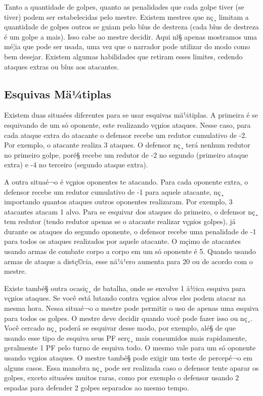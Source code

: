 Tanto a quantidade de golpes, quanto as penalidades que cada golpe tiver (se tiver) podem ser estabelecidas pelo mestre. Existem mestres que nç¸ limitam a quantidade de golpes outros se guiam pelo bîus de destreza (cada bîus de destreza é um golpe a mais). Isso cabe ao mestre decidir. Aqui nî§ apenas mostramos uma mé¦ia que pode ser usada, uma vez que o narrador pode utilizar do modo como bem desejar. Existem algumas habilidades que retiram esses limites, cedendo ataques extras ou bîus aos atacantes. 

\subsection{Esquivas Mä¼tiplas}

Existem duas situaées diferentes para se usar esquivas mä¼tiplas. A primeira é se esquivando de um só oponente, este realizando vçµios ataques. Nesse caso, para cada ataque extra do atacante o defensor recebe um redutor cumulativo de -2. Por exemplo, o atacante realiza 3 ataques. O defensor nç¸ terá nenhum redutor no primeiro golpe, poré§ recebe um redutor de -2 no segundo (primeiro ataque extra) e -4 no terceiro (segundo ataque extra).

A outra situaé¬o é vçµios oponentes te atacando.  Para cada oponente extra, o defensor recebe um redutor cumulativo de -1 para aquele atacante, nç¸ importando quantos ataques outros oponentes realizaram. Por exemplo, 3 atacantes atacam 1 alvo. Para se esquivar dos ataques do primeiro, o defensor nç¸ tem redutor (tendo redutor apenas se o atacante realizar vçµios golpes), já durante os ataques do segundo oponente, o defensor recebe uma penalidade de -1 para todos os ataques realizados por aquele atacante. O mçimo de atacantes usando armas de combate corpo a corpo em um só oponente é 5. Quando usando armas de ataque a distç©cia, esse nä¼¹ero aumenta para 20 ou de acordo com o mestre.

Existe també§ outra ocasiç¸ de batalha, onde se envolve 1 ä½ica esquiva para vçµios ataques. Se você está lutando contra vçµios alvos eles podem atacar na mesma hora. Nessa situaé¬o o mestre pode permitir o uso de apenas uma esquiva para todos os golpes. O mestre deve decidir quando você pode fazer isso ou nç¸. Você cercado nç¸ poderá se esquivar desse modo, por exemplo, alé§ de que usando esse tipo de esquiva seus PF serç¸ mais consumidos mais rapidamente, geralmente 1 PF pelo turno de esquiva todo. O mesmo vale para um só oponente usando vçµios ataques. O mestre també§ pode exigir um teste de percepé¬o em alguns casos. Essa manobra nç¸ pode ser realizada caso o defensor tente aparar os golpes, exceto situaées muitos raras, como por exemplo o defensor usando 2 espadas para defender 2 golpes separados ao mesmo tempo.

